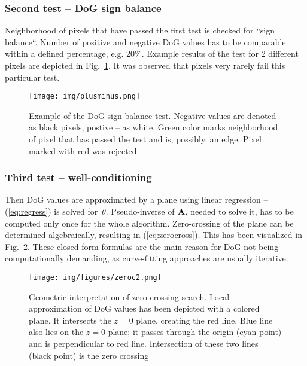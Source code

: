 \subsubsection*{Second test -- DoG sign balance}
\label{edge_second}

Neighborhood of pixels that have passed the first test is checked for ``sign balance``. Number of positive and negative DoG values has to be comparable within a defined percentage, e.g. 20\%. Example results of the test for 2 different pixels are depicted in Fig.~\ref{fig:plusminus}. It was observed that pixels very rarely fail this particular test.

\begin{figure}[ht]
	\centering\texttt{[image: img/plusminus.png]}
	\caption{ Example of the DoG sign balance test. Negative values are denoted as black pixels, postive -- as white. Green color marks neighborhood of pixel that has passed the test and is, possibly, an edge. Pixel marked with red was rejected }
	\label{fig:plusminus}
\end{figure}

\subsubsection*{Third test -- well-conditioning}
\label{edge_third}

Then DoG values are approximated by a plane using linear regression -- (\ref{eq:regress}) is solved for~$\theta$. Pseudo-inverse of $\textbf{A}$, needed to solve it, has to be computed only once for the whole algorithm. Zero-crossing of the plane can be determined algebraically, resulting in (\ref{eq:zerocross}). This has been visualized in Fig.~\ref{fig:zeroc}. These closed-form formulas are the main reason for DoG not being computationally demanding, as curve-fitting approaches are usually iterative.

\begin{figure}[ht]
	\centering\texttt{[image: img/figures/zeroc2.png]}
	\caption{ Geometric interpretation of zero-crossing search. Local approximation of DoG values has been depicted with a colored plane. It intersects the $z=0$ plane, creating the red line. Blue line also lies on the $z=0$ plane; it passes through the origin (cyan point) and is perpendicular to red line. Intersection of these two lines (black point) is the zero crossing }
	\label{fig:zeroc}
\end{figure}

